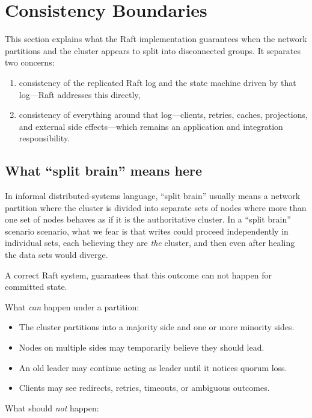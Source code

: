 \section{Consistency Boundaries}
\label{sec:ConsistencyBoundaries}

This section explains what the Raft implementation guarantees when the
network partitions and the cluster appears to split into disconnected
groups. It separates two concerns:

\begin{enumerate}
\item consistency of the replicated Raft log and the state machine driven
by that log---Raft addresses this directly,
\item consistency of everything around that log---clients, retries, caches,
projections, and external side effects---which remains an application and
integration responsibility.
\end{enumerate}

\subsection{What ``split brain'' means here}

In informal distributed-systems language, ``split brain'' usually means a
network partition where the cluster is divided into separate sets of nodes
where more than one set of nodes behaves as if it is the authoritative cluster.
In a ``split brain'' scenario scenario, what we fear is that writes could proceed 
independently in individual sets, each believing they are \emph{the} cluster, and 
then even after healing the data sets would diverge. 

A correct Raft system, guarantees that this outcome can not happen for 
committed state.

What \emph{can} happen under a partition:

\begin{itemize}
\item The cluster partitions into a majority side and one or more minority
sides.
\item Nodes on multiple sides may temporarily believe they should lead.
\item An old leader may continue acting as leader until it notices quorum
loss.
\item Clients may see redirects, retries, timeouts, or ambiguous outcomes.
\end{itemize}

What should \emph{not} happen:

